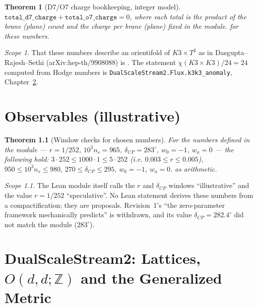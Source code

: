\documentclass[11pt,a4paper]{report}
\newtheorem{theorem}{Theorem}[chapter]
\theoremstyle{remark}
\newtheorem*{scope}{Scope}
\begin{document}
\begin{theorem}[D7/O7 charge bookkeeping, integer model]\label{thm:tadpole_cancellation}
\leanok
$\texttt{total\_d7\_charge} + \texttt{total\_o7\_charge} = 0$, where each total is the product of the
brane (plane) count and the charge per brane (plane) fixed in the module. \TA{} for these numbers.
\end{theorem}
\begin{scope}
That these numbers describe an orientifold of $K3\times T^2$ as in Dasgupta--Rajesh--Sethi
(arXiv:hep-th/9908088) is \TL{}. The statement $\chi(K3\times K3)/24=24$ computed from Hodge numbers is
\texttt{DualScaleStream2.Flux.k3k3\_anomaly}, Chapter~\ref{ch:s2}.
\end{scope}

\chapter{Observables (illustrative)}

\begin{theorem}[Window checks for chosen numbers]\label{thm:observables_contract}
\leanok
For the numbers \emph{defined} in the module --- $r=1/252$, $10^3 n_s=965$, $\delta_{CP}=283^\circ$,
$w_0=-1$, $w_a=0$ --- the following hold: $3\cdot252\le1000\cdot1\le5\cdot252$ (i.e.
$0.003\le r\le0.005$), $950\le10^3n_s\le980$, $270\le\delta_{CP}\le295$, $w_0=-1$, $w_a=0$. \TA{} as
arithmetic.
\end{theorem}
\begin{scope}
The Lean module itself calls the $r$ and $\delta_{CP}$ windows ``illustrative'' and the value $r=1/252$
``speculative''. No Lean statement derives these numbers from a compactification; they are \TC{} proposals.
Revision~1's ``the zero-parameter framework mechanically predicts'' is withdrawn, and its value
$\delta_{CP}=282.4^\circ$ did not match the module ($283^\circ$).
\end{scope}

\chapter{DualScaleStream2: Lattices, $O(d,d;\mathbb{Z})$ and the Generalized Metric}\label{ch:s2}
\end{document}

